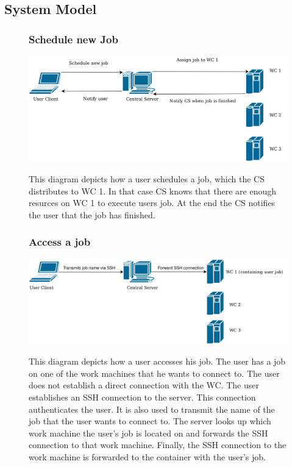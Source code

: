 \subsection{System Model}
\begin{figure}[H]
  \subsubsection{Schedule new Job}
  \centering
  \includegraphics[width=\linewidth]{./system/systemmodel/images/schedulejob.png}
  \label{new-job}
  \caption{This diagram depicts how a user schedules a job, which the CS distributes to WC 1.
  In that case CS knows that there are enough resurces on WC 1 to execute users job.
  At the end the CS notifies the user that the job has finished.}
\end{figure}

\begin{figure}[H]
  \subsubsection{Access a job}
  \centering
  \includegraphics[width=\linewidth]{./system/systemmodel/images/accessjob.png}
  \label{access-job}
  \caption{This diagram depicts how a user accesses his job.
  The user has a job on one of the work machines that he wants to connect to.
  The user does not establish a direct connection with the WC.
  The user establishes an SSH connection to the server.
  This connection authenticates the user.
  It is also used to transmit the name of the job that the user wants to connect to.
  The server looks up which work machine the user's job is located on and forwards the SSH connection to that work machine.
  Finally, the SSH connection to the work machine is forwarded to the container with the user's job.}
\end{figure}

